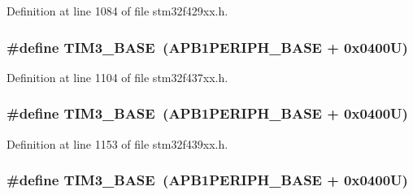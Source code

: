 Definition at line 1084 of file stm32f429xx.\+h.

\subsubsection[{\texorpdfstring{T\+I\+M3\+\_\+\+B\+A\+SE}{TIM3_BASE}}]{\setlength{\rightskip}{0pt plus 5cm}\#define T\+I\+M3\+\_\+\+B\+A\+SE~({\bf A\+P\+B1\+P\+E\+R\+I\+P\+H\+\_\+\+B\+A\+SE} + 0x0400\+U)}\hypertarget{group___peripheral__memory__map_gaf0c34a518f87e1e505cd2332e989564a}{}\label{group___peripheral__memory__map_gaf0c34a518f87e1e505cd2332e989564a}


Definition at line 1104 of file stm32f437xx.\+h.

\subsubsection[{\texorpdfstring{T\+I\+M3\+\_\+\+B\+A\+SE}{TIM3_BASE}}]{\setlength{\rightskip}{0pt plus 5cm}\#define T\+I\+M3\+\_\+\+B\+A\+SE~({\bf A\+P\+B1\+P\+E\+R\+I\+P\+H\+\_\+\+B\+A\+SE} + 0x0400\+U)}\hypertarget{group___peripheral__memory__map_gaf0c34a518f87e1e505cd2332e989564a}{}\label{group___peripheral__memory__map_gaf0c34a518f87e1e505cd2332e989564a}


Definition at line 1153 of file stm32f439xx.\+h.

\subsubsection[{\texorpdfstring{T\+I\+M3\+\_\+\+B\+A\+SE}{TIM3_BASE}}]{\setlength{\rightskip}{0pt plus 5cm}\#define T\+I\+M3\+\_\+\+B\+A\+SE~({\bf A\+P\+B1\+P\+E\+R\+I\+P\+H\+\_\+\+B\+A\+SE} + 0x0400\+U)}\hypertarget{group___peripheral__memory__map_gaf0c34a518f87e1e505cd2332e989564a}{}\label{group___peripheral__memory__map_gaf0c34a518f87e1e505cd2332e989564a}


